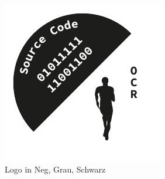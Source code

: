 \documentclass[a4paper,fontsize=14pt,DIV=calc,fleqn,parskip=half]{scrartcl}
\begin{document}
\begin{figure}[!h]
\begin{minipage}[b]{0.30\textwidth}
		\end{minipage}
		\hfill
		\begin{minipage}[b]{0.20\textwidth}
			\includegraphics[width=\textwidth]{images/Logo/Logo-SW}%
		\end{minipage}
		\caption{Logo in Neg, Grau, Schwarz}\label{fig:logoneggrauschwarz}%
	\end{figure}

	\newpage
\end{document}
